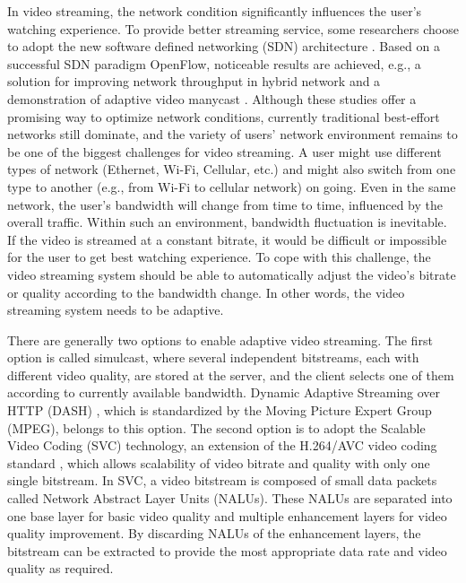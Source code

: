 \documentclass[journal]{IEEEtran}
\begin{document}
In video streaming, the network condition significantly influences the user's watching experience. To provide better streaming service, some researchers choose to adopt the new software defined networking (SDN) architecture \cite{Egilmez14}. Based on a successful SDN paradigm OpenFlow, noticeable results are achieved, e.g., a solution for improving network throughput in hybrid network \cite{Li14} and a demonstration of adaptive video manycast \cite{Xue15}. Although these studies offer a promising way to optimize network conditions, currently traditional best-effort networks still dominate, and the variety of users' network environment remains to be one of the biggest challenges for video streaming. A user might use different types of network (Ethernet, Wi-Fi, Cellular, etc.) and might also switch from one type to another (e.g., from Wi-Fi to cellular network) on going. Even in the same network, the user's bandwidth will change from time to time, influenced by the overall traffic. Within such an environment, bandwidth fluctuation is inevitable. If the video is streamed at a constant bitrate, it would be difficult or impossible for the user to get best watching experience. To cope with this challenge, the video streaming system should be able to automatically adjust the video's bitrate or quality according to the bandwidth change. In other words, the video streaming system needs to be adaptive.

There are generally two options to enable adaptive video streaming. The first option is called simulcast, where several independent bitstreams, each with different video quality, are stored at the server, and the client selects one of them according to currently available bandwidth. Dynamic Adaptive Streaming over HTTP (DASH) \cite{DASH}, which is standardized by the Moving Picture Expert Group (MPEG), belongs to this option. The second option is to adopt the Scalable Video Coding (SVC) \cite{SVC} technology, an extension of the H.264/AVC video coding standard \cite{SVCOverview}, which allows scalability of video bitrate and quality with only one single bitstream. In SVC, a video bitstream is composed of small data packets called Network Abstract Layer Units (NALUs). These NALUs are separated into one base layer for basic video quality and multiple enhancement layers for video quality improvement. By discarding NALUs of the enhancement layers, the bitstream can be extracted to provide the most appropriate data rate and video quality as required.
\end{document}

